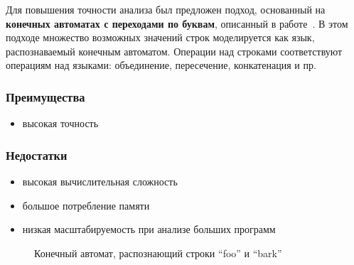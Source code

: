 Для повышения точности анализа был предложен подход, основанный на \textbf{конечных автоматах с переходами по буквам}, описанный в работе~\cite{apinis2020symbolic}. В этом подходе множество возможных значений строк моделируется как язык, распознаваемый конечным автоматом. Операции над строками соответствуют операциям над языками: объединение, пересечение, конкатенация и пр.

\subsubsection*{Преимущества}
\begin{itemize}
    \item высокая точность
\end{itemize}

\subsubsection*{Недостатки}
\begin{itemize}
    \item высокая вычислительная сложность
    \item большое потребление памяти
    \item низкая масштабируемость при анализе больших программ
\end{itemize}

\begin{figure}[h]
    \centering
    \caption{Конечный автомат, распознающий строки ``foo'' и ``bark''}
\label{fig:automaton}
\end{figure}

